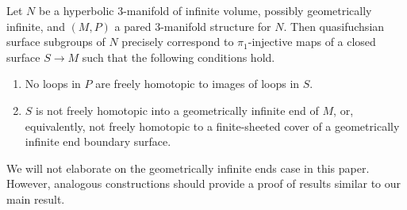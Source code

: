 \begin{prop}

Let $N$ be a hyperbolic 3-manifold of infinite volume, possibly geometrically
infinite, and $(M,P)$ a pared 3-manifold structure for $N$. Then quasifuchsian
surface subgroups of $N$ precisely correspond to $\pi_1$-injective maps of
a closed surface $S \to M$ such that the following conditions hold.

\begin{enumerate}

\item No loops in $P$ are freely homotopic to images of loops in $S$.

\item $S$ is not freely homotopic into a geometrically infinite end of $M$, or,
equivalently, not freely homotopic to a finite-sheeted cover of a geometrically
infinite end boundary surface.

\end{enumerate}

\end{prop}

We will not elaborate on the geometrically infinite ends case in this paper.
However, analogous constructions should provide a proof of results similar to
our main result.


